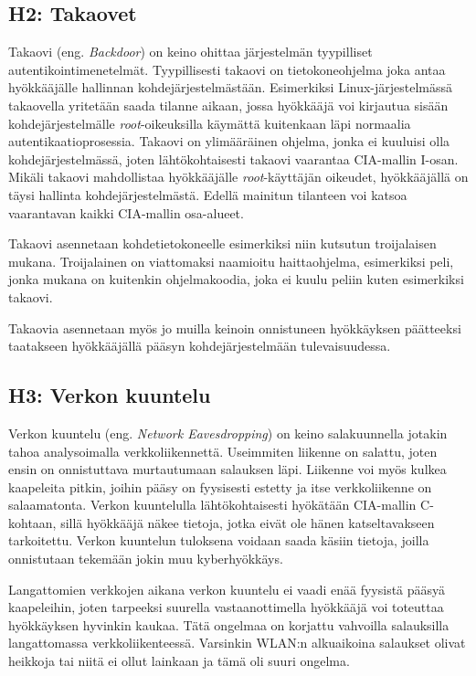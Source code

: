 \subsection{H2: Takaovet}
Takaovi (eng. \textit{Backdoor}) on keino ohittaa järjestelmän tyypilliset autentikointimenetelmät. Tyypillisesti takaovi on tietokoneohjelma joka antaa hyökkääjälle hallinnan kohdejärjestelmästään. Esimerkiksi Linux-järjestelmässä takaovella yritetään saada tilanne aikaan, jossa hyökkääjä voi kirjautua sisään kohdejärjestelmälle \textit{root}-oikeuksilla käymättä kuitenkaan läpi normaalia autentikaatioprosessia. Takaovi on ylimääräinen ohjelma, jonka ei kuuluisi olla kohdejärjestelmässä, joten lähtökohtaisesti takaovi vaarantaa CIA-mallin I-osan. Mikäli takaovi mahdollistaa hyökkääjälle \textit{root}-käyttäjän oikeudet, hyökkääjällä on täysi hallinta kohdejärjestelmästä. Edellä mainitun tilanteen voi katsoa vaarantavan kaikki CIA-mallin osa-alueet.

Takaovi asennetaan kohdetietokoneelle esimerkiksi niin kutsutun troijalaisen mukana. Troijalainen on viattomaksi naamioitu haittaohjelma, esimerkiksi peli, jonka mukana on kuitenkin ohjelmakoodia, joka ei kuulu peliin kuten esimerkiksi takaovi.

Takaovia asennetaan myös jo muilla keinoin onnistuneen hyökkäyksen päätteeksi taatakseen hyökkääjällä pääsyn kohdejärjestelmään tulevaisuudessa.~\cite{tipton2007information}

\subsection{H3: Verkon kuuntelu}
Verkon kuuntelu (eng. \textit{Network Eavesdropping}) on keino salakuunnella jotakin tahoa analysoimalla verkkoliikennettä. Useimmiten liikenne on salattu, joten ensin on onnistuttava murtautumaan salauksen läpi. Liikenne voi myös kulkea kaapeleita pitkin, joihin pääsy on fyysisesti estetty ja itse verkkoliikenne on salaamatonta. Verkon kuuntelulla lähtökohtaisesti hyökätään CIA-mallin C-kohtaan, sillä hyökkääjä näkee tietoja, jotka eivät ole hänen katseltavakseen tarkoitettu. Verkon kuuntelun tuloksena voidaan saada käsiin tietoja, joilla onnistutaan tekemään jokin muu kyberhyökkäys.

Langattomien verkkojen aikana verkon kuuntelu ei vaadi enää fyysistä pääsyä kaapeleihin, joten tarpeeksi suurella vastaanottimella hyökkääjä voi toteuttaa hyökkäyksen hyvinkin kaukaa. Tätä ongelmaa on korjattu vahvoilla salauksilla langattomassa verkkoliikenteessä. Varsinkin WLAN:n alkuaikoina salaukset olivat heikkoja tai niitä ei ollut lainkaan ja tämä oli suuri ongelma.~\cite{andress2014basics}

